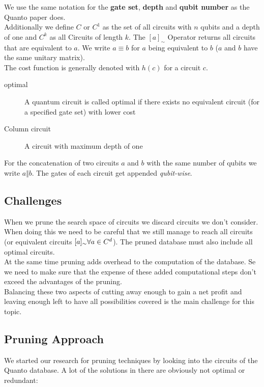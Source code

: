 We use the same notation for the \textbf{gate set}, \textbf{depth} and \textbf{qubit number} as the Quanto paper does. \\

Additionally we define $C$ or $C^1$ as the set of all circuits with $n$ qubits and a depth of one and $C^k$ as all Circuits of length $k$. The $[a]_\sim$ Operator returns all circuits that are equivalent to $a$. We write $a\equiv b$ for $a$ being equivalent to $b$ ($a$ and $b$ have the same unitary matrix).\\

The cost function is generally denoted with $h(c)$ for a circuit $c$.

\begin{description}
	\item[optimal] A quantum circuit is called optimal if there exists no equivalent circuit (for a specified gate set) with lower cost
	
	\item[Column circuit] A circuit with maximum depth of one
\end{description}

For the concatenation of two circuits $a$ and $b$ with the same number of qubits we write $a\Vert b$. The gates of each circuit get appended \textit{qubit-wise}.


\subsection{Challenges}
When we prune the search space of circuits we discard circuits we don't consider. When doing this we need to be careful that we still manage to reach all circuits 
(or equivalent circuits $[a]_\sim\space\forall a\in C^d$). The pruned database must also include all optimal circuits.\\

At the same time pruning adds overhead to the computation of the database. Se we need to make sure that the expense of these added computational steps don't exceed the advantages of the pruning.\\

Balancing these two aspects of cutting away enough to gain a net profit and leaving enough left to have all possibilities covered is the main challenge for this topic.

\subsection{Pruning Approach}
We started our research for pruning techniques by looking into the circuits of the Quanto database. A lot of the solutions in there are obviously not optimal or redundant: 

